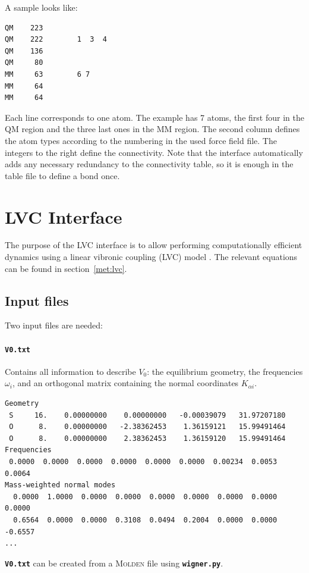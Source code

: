 \documentclass[a4paper,10pt,DIV=15,openany]{scrbook}
\newcommand{\tthdump}[1]{#1}
\newcommand{\ttt}[1]{\textbf{\texttt{#1}}}
\newenvironment{example}{
  \setlength{\OuterFrameSep}{3pt}
  \vspace{0mm}
  \definecolor{shadecolor}{HTML}{E4F4FF}
  \begin{shaded}
}{
  \end{shaded}
}
\begin{document}
A sample looks like:

\begin{example}
\begin{verbatim}
QM    223        
QM    222        1  3  4
QM    136        
QM     80        
MM     63        6 7
MM     64       
MM     64       
\end{verbatim}
\end{example}

Each line corresponds to one atom.
The example has 7 atoms, the first four in the QM region and the three last ones in the MM region.
The second column defines the atom types according to the numbering in the used force field file.
The integers to the right define the connectivity. 
Note that the interface automatically adds any necessary redundancy to the connectivity table, so it is enough in the table file to define a bond once.














\tthdump{\FloatBarrier}
\section{LVC Interface}\label{sec:int:lvc}

The purpose of the LVC interface is to allow performing computationally efficient dynamics using a linear vibronic coupling (LVC) model \cite{Koeppel84ACP}.
The relevant equations can be found in section~\ref{met:lvc}.

\subsection{Input files}

Two input files are needed:

\paragraph{\ttt{V0.txt}} Contains all information to describe $V_0$: the equilibrium geometry, the frequencies $\omega_i$, and an orthogonal matrix containing the normal coordinates $K_{\alpha i}$.
\begin{example}
\begin{verbatim}
Geometry
 S     16.    0.00000000    0.00000000   -0.00039079   31.97207180
 O      8.    0.00000000   -2.38362453    1.36159121   15.99491464
 O      8.    0.00000000    2.38362453    1.36159120   15.99491464
Frequencies
 0.0000  0.0000  0.0000  0.0000  0.0000  0.0000  0.00234  0.0053  0.0064
Mass-weighted normal modes
  0.0000  1.0000  0.0000  0.0000  0.0000  0.0000  0.0000  0.0000  0.0000
  0.6564  0.0000  0.0000  0.3108  0.0494  0.2004  0.0000  0.0000 -0.6557
...
\end{verbatim}
\end{example}
\ttt{V0.txt} can be created from a \textsc{Molden} file using \ttt{wigner.py}.
\end{document}
